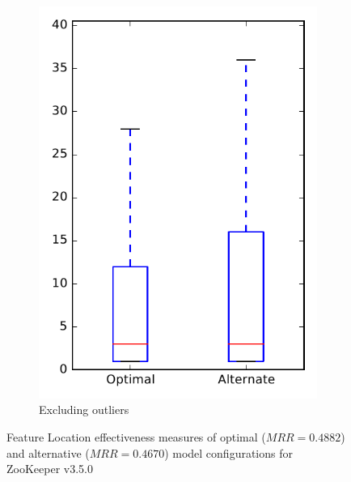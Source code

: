 \begin{figure}
\begin{subfigure}{.4\textwidth}
        \includegraphics[height=0.4\textheight]{figures/combo/flt_rq1_zookeeper_no_outlier}
        \caption{Excluding outliers}\label{fig:combo:flt:rq1:zookeeper_no_outlier}
    \end{subfigure}
\caption{Feature Location effectiveness measures of optimal ($MRR=0.4882$) and alternative ($MRR=0.4670$) model configurations for ZooKeeper v3.5.0}
\label{fig:combo:flt:rq1:zookeeper}
\end{figure}
